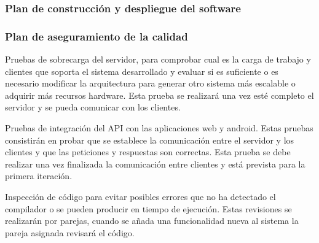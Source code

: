 \documentclass{article}
\begin{document}
\subsubsection{Plan de construcción y despliegue del software}


\subsubsection{Plan de aseguramiento de la calidad}

Pruebas de sobrecarga del servidor, para comprobar cual es la carga de trabajo y clientes que soporta el sistema desarrollado y evaluar si es suficiente o es necesario modificar la arquitectura para generar otro sistema más escalable o adquirir más recursos hardware. Esta prueba se realizará una vez esté completo el servidor y se pueda comunicar con los clientes.

Pruebas de integración del API con las aplicaciones web y android. Estas pruebas consistirán en probar que se establece la comunicación entre el servidor y los clientes y que las peticiones y respuestas son correctas. Esta prueba se debe realizar una vez finalizada la comunicación entre clientes y está prevista para la primera iteración.

Inspección de código para evitar posibles errores que no ha detectado el compilador o se pueden producir en tiempo de ejecución. Estas revisiones se realizarán por parejas, cuando se añada una funcionalidad nueva al sistema la pareja asignada revisará el código.
\end{document}
